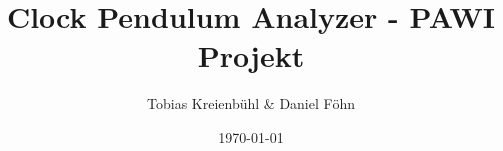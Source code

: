 \documentclass{beamer}
\title{Clock Pendulum Analyzer - PAWI Projekt}
\author{Tobias Kreienbühl \& Daniel Föhn}
\institute{Hochschule Luzern, Informatik}
\date{\today}
\begin{document}
\begin{frame}
	\titlepage
\end{frame}










\end{document}
